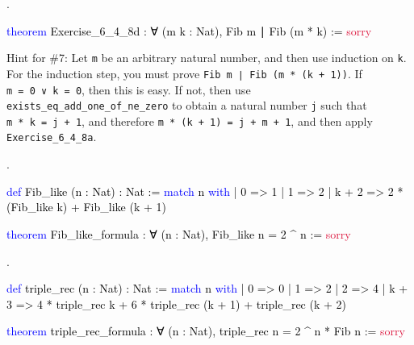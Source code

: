 \documentclass[
  letterpaper,
  DIV=11,
  numbers=noendperiod]{scrreprt}
\newenvironment{Shaded}{\begin{snugshade}}{\end{snugshade}}
\newcommand{\ConstantTok}[1]{\textcolor[rgb]{0.56,0.35,0.01}{#1}}
\newcommand{\KeywordTok}[1]{\textcolor[rgb]{0.00,0.23,0.31}{#1}}
\newcommand{\NormalTok}[1]{\textcolor[rgb]{0.00,0.23,0.31}{#1}}
\renewcommand{\NormalTok}[1]{\textcolor[HTML]{000000}{#1}}
\renewcommand{\KeywordTok}[1]{\textcolor[HTML]{0000FF}{#1}}
\renewcommand{\ConstantTok}[1]{\textcolor[HTML]{DC143C}{#1}}
\newcommand{\nobreakShaded}{\renewenvironment{Shaded}
	{\begin{tcolorbox}[frame hidden, enhanced, interior hidden, boxrule=0pt,
		borderline west={3pt}{0pt}{shadecolor}, sharp corners]}
	{\end{tcolorbox}}}
\newenvironment{numex}[1]
	{\begin{minipage}[t]{0.04\textwidth}\vspace{8pt}{#1}.
		\end{minipage}\nobreakShaded\begin{minipage}[t]{0.96\textwidth}\vspace{0pt}}
	{\end{minipage}}
\theoremstyle{remark}
\begin{document}
\begin{numex}{7}

\begin{Shaded}
\begin{Highlighting}[]
\KeywordTok{theorem}\NormalTok{ Exercise\_6\_4\_8d : ∀ (m k : Nat), Fib m ∣ Fib (m * k) := }\ConstantTok{sorry}
\end{Highlighting}
\end{Shaded}

Hint for \#7: Let \texttt{m} be an arbitrary natural number, and then
use induction on \texttt{k}. For the induction step, you must prove
\texttt{Fib\ m\ ∣\ Fib\ (m\ *\ (k\ +\ 1))}. If
\texttt{m\ =\ 0\ ∨\ k\ =\ 0}, then this is easy. If not, then use
\texttt{exists\_eq\_add\_one\_of\_ne\_zero} to obtain a natural number
\texttt{j} such that \texttt{m\ *\ k\ =\ j\ +\ 1}, and therefore
\texttt{m\ *\ (k\ +\ 1)\ =\ j\ +\ m\ +\ 1}, and then apply
\texttt{Exercise\_6\_4\_8a}.

\end{numex}

\begin{numex}{8}

\begin{Shaded}
\begin{Highlighting}[]
\KeywordTok{def}\NormalTok{ Fib\_like (n : Nat) : Nat :=}
  \KeywordTok{match}\NormalTok{ n }\KeywordTok{with}
\NormalTok{    | 0 =\textgreater{} 1}
\NormalTok{    | 1 =\textgreater{} 2}
\NormalTok{    | k + 2 =\textgreater{} 2 * (Fib\_like k) + Fib\_like (k + 1)}

\KeywordTok{theorem}\NormalTok{ Fib\_like\_formula : ∀ (n : Nat), Fib\_like n = 2 \^{} n := }\ConstantTok{sorry}
\end{Highlighting}
\end{Shaded}

\end{numex}

\begin{numex}{9}

\begin{Shaded}
\begin{Highlighting}[]
\KeywordTok{def}\NormalTok{ triple\_rec (n : Nat) : Nat :=}
  \KeywordTok{match}\NormalTok{ n }\KeywordTok{with}
\NormalTok{    | 0 =\textgreater{} 0}
\NormalTok{    | 1 =\textgreater{} 2}
\NormalTok{    | 2 =\textgreater{} 4}
\NormalTok{    | k + 3 =\textgreater{} 4 * triple\_rec k +}
\NormalTok{                6 * triple\_rec (k + 1) + triple\_rec (k + 2)}

\KeywordTok{theorem}\NormalTok{ triple\_rec\_formula :}
\NormalTok{    ∀ (n : Nat), triple\_rec n = 2 \^{} n * Fib n := }\ConstantTok{sorry}
\end{Highlighting}
\end{Shaded}

\end{numex}
\end{document}
